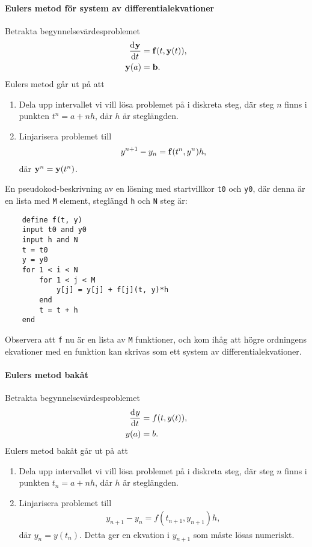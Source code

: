 \paragraph{Eulers metod för system av differentialekvationer}
Betrakta begynnelsevärdesproblemet
\begin{align*}
	\dv[]{\vb{y}}{t} (t) &= \vb{f}(t, \vb{y}(t)), \\
	\vb{y}(a)            &= \vb{b}.
\end{align*}
Eulers metod går ut på att
\begin{enumerate}
	\item Dela upp intervallet vi vill lösa problemet på i diskreta steg, där steg $n$ finns i punkten $t^{n} = a + nh$, där $h$ är steglängden.
	\item Linjarisera problemet till
	\begin{align*}
		y^{n + 1} - y_{n} = \vb{f}(t^{n}, y^{n})h,
	\end{align*}
	där $\vb{y}^{n} = \vb{y}(t^{n})$.
\end{enumerate}

En pseudokod-beskrivning av en lösning med startvillkor \verb|t0| och \verb|y0|, där denna är en lista med \verb|M| element, steglängd \verb|h| och \verb|N| steg är:
\begin{lstlisting}
	define f(t, y)
	input t0 and y0
	input h and N
	t = t0
	y = y0
	for 1 < i < N
		for 1 < j < M
			y[j] = y[j] + f[j](t, y)*h
		end
		t = t + h
	end
\end{lstlisting}

Observera att \verb|f| nu är en lista av \verb|M| funktioner, och kom ihåg att högre ordningens ekvationer med en funktion kan skrivas som ett system av differentialekvationer.

\paragraph{Eulers metod bakåt}
Betrakta begynnelsevärdesproblemet
\begin{align*}
	\dv[]{y}{t} (t) &= f(t, y(t)), \\
	y(a)            &= b.
\end{align*}
Eulers metod bakåt går ut på att
\begin{enumerate}
	\item Dela upp intervallet vi vill lösa problemet på i diskreta steg, där steg $n$ finns i punkten $t_{n} = a + nh$, där $h$ är steglängden.
	\item Linjarisera problemet till
	\begin{align*}
		y_{n + 1} - y_{n} = f(t_{n + 1}, y_{n + 1})h,
	\end{align*}
	där $y_{n} = y(t_{n})$. Detta ger en ekvation i $y_{n + 1}$ som måste lösas numeriskt.
\end{enumerate}